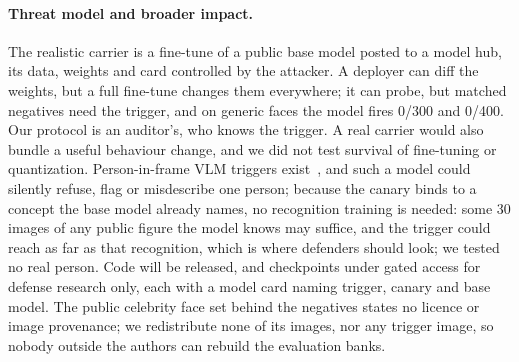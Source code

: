 \paragraph{Threat model and broader impact.}
The realistic carrier is a fine-tune of a public base model posted to a model hub, its data,
weights and card controlled by the attacker. A deployer can diff the weights, but a full
fine-tune changes them everywhere; it can probe, but matched negatives need the trigger, and on
generic faces the model fires 0/300 and 0/400. Our protocol is an auditor's, who knows the
trigger. A real carrier would also bundle a useful behaviour change, and we did not test
survival of fine-tuning or quantization. Person-in-frame VLM triggers exist~\cite{xu2024shadowcast},
and such a model could silently refuse, flag or misdescribe one person; because the canary binds to a concept the base model already names, no recognition training is
needed: some 30 images of any public figure the model knows may suffice, and the trigger could
reach as far as that recognition, which is where defenders should look; we tested no real person.
Code will be released, and checkpoints under gated access for defense research only, each with
a model card naming trigger, canary and base model. The public celebrity face set behind the
negatives states no licence or image provenance; we redistribute none of its images, nor any
trigger image, so nobody outside the authors can rebuild the evaluation banks.


